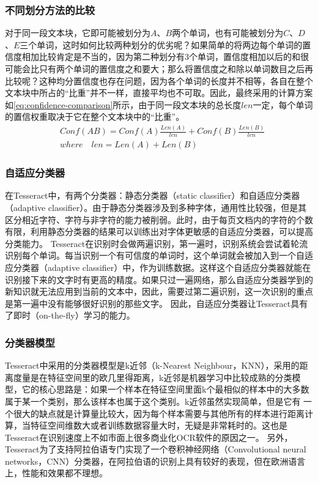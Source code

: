 \subsubsection*{不同划分方法的比较}
对于同一段文本块，它即可能被划分为$A$、$B$两个单词，也有可能被划分为$C$、$D$、$E$三个单词，这时如何比较两种划分的优劣呢？如果简单的将两边每个单词的置信度相加比较肯定是不当的，因为第二种划分有3个单词，置信度相加以后的和很可能会比只有两个单词的置信度之和要大；那么将置信度之和除以单词数目之后再比较呢？这种均分置信度也存在问题，因为各个单词的长度并不相等，各自在整个文本块中所占的“比重”并不一样，直接平均也不可取。因此，最终采用的计算方案如\autoref{eq:confidence-comparison}所示，由于同一段文本块的总长度$len$一定，每个单词的置信权重取决于它在整个文本块中的“比重”。
\begin{equation} \label{eq:confidence-comparison}
	\begin{split}
		&Conf(AB) = Conf(A)\frac{Len(A)}{len} + Conf(B)\frac{Len(B)}{len} \\
		&where \quad len=Len(A) + Len(B)
	\end{split}
\end{equation}

\subsubsection*{自适应分类器}
在Tesseract中，有两个分类器：静态分类器（static classifier）和自适应分类器（adaptive classifier）。由于静态分类器涉及到多种字体，通用性比较强，但是其区分相近字符、字符与非字符的能力被削弱。此时，由于每页文档内的字符的个数有限，利用静态分类器的结果可以训练出对字体更敏感的自适应分类器，可以提高分类能力。%
Tesseract在识别时会做两遍识别，第一遍时，识别系统会尝试着轮流识别每个单词。每当识别一个有可信度的单词时，这个单词就会被加入到一个自适应分类器（adaptive classifier）中，作为训练数据。这样这个自适应分类器就能在识别接下来的文字时有更高的精度。如果只过一遍网络，那么自适应分类器学到的新知识就无法应用到当前的文本中，因此，需要过第二遍识别，这一次识别的重点是第一遍中没有能够很好识别的那些文字。%
因此，自适应分类器让Tesseract具有了即时（on-the-fly）学习的能力。

\subsubsection*{分类器模型}
Tesseract中采用的分类器模型是k近邻（k-Nearest Neighbour，KNN），采用的距离度量是在特征空间里的欧几里得距离，k近邻是机器学习中比较成熟的分类模型，它的核心思路是：如果一个样本在特征空间里面k个最相似的样本中的大多数属于某一个类别，那么该样本也属于这个类别。k近邻虽然实现简单，但是它有 一个很大的缺点就是计算量比较大，因为每个样本需要与其他所有的样本进行距离计算，当特征空间维数大或者训练数据容量大时，无疑是非常耗时的。这也是Tesseract在识别速度上不如市面上很多商业化OCR软件的原因之一。
另外，Tesseract为了支持阿拉伯语专门实现了一个卷积神经网络（Convolutional neural networks，CNN）分类器，在阿拉伯语的识别上具有较好的表现，但在欧洲语言上，性能和效果都不理想。%

